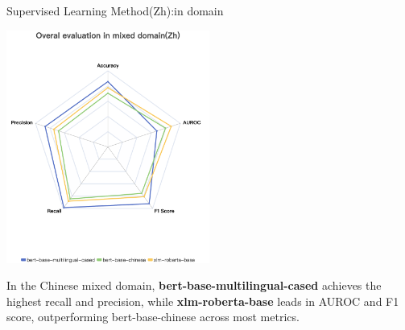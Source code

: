 \documentclass[serif]{beamer}
\begin{document}
\begin{frame}{Supervised Learning Method(Zh):in domain}

\centering
\includegraphics[width=0.5\textwidth]{images/Overal evaluation in mixed domain(Zh).png}

\vspace{-0.2em}
\begin{flushleft}
\scriptsize
In the Chinese mixed domain, \textbf{bert-base-multilingual-cased} achieves the highest recall and precision, while \textbf{xlm-roberta-base} leads in AUROC and F1 score, outperforming bert-base-chinese across most metrics.
\normalize
\end{flushleft}

\end{frame}
\end{document}
